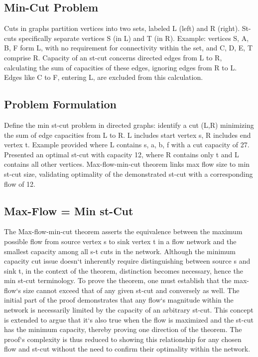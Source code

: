 \subsection*{Min-Cut Problem}
Cuts in graphs partition vertices into two sets, labeled L (left) and R (right).
St-cuts specifically separate vertices S (in L) and T (in R).
Example: vertices S, A, B, F form L, with no requirement for connectivity within the set, and C, D, E, T comprise R\@.
Capacity of an st-cut concerns directed edges from L to R, calculating the sum of capacities of these edges, ignoring edges from R to L\@.
Edges like C to F, entering L, are excluded from this calculation.

\subsection*{Problem Formulation}
Define the min st-cut problem in directed graphs: identify a cut (L,R) minimizing the sum of edge capacities from L to R\@.
L includes start vertex s, R includes end vertex t.
Example provided where L contains s, a, b, f with a cut capacity of 27.
Presented an optimal st-cut with capacity 12, where R contains only t and L contains all other vertices.
Max-flow-min-cut theorem links max flow size to min st-cut size, validating optimality of the demonstrated st-cut with a corresponding flow of 12.

\subsection*{Max-Flow = Min st-Cut}
The Max-flow-min-cut theorem asserts the equivalence between the maximum possible flow from source vertex s to sink vertex t in a flow network and the smallest capacity among all s-t cuts in the network.
Although the minimum capacity cut issue doesn`t inherently require distinguishing between source s and sink t, in the context of the theorem, distinction becomes necessary, hence the min st-cut terminology.
To prove the theorem, one must establish that the max-flow`s size cannot exceed that of any given st-cut and conversely as well.
The initial part of the proof demonstrates that any flow`s magnitude within the network is necessarily limited by the capacity of an arbitrary st-cut.
This concept is extended to argue that it`s also true when the flow is maximized and the st-cut has the minimum capacity, thereby proving one direction of the theorem.
The proof`s complexity is thus reduced to showing this relationship for any chosen flow and st-cut without the need to confirm their optimality within the network.


